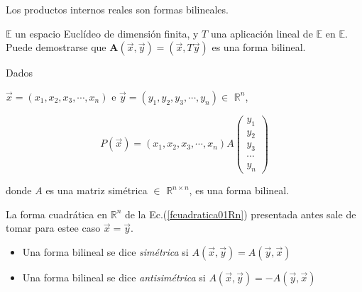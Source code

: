 \bigskip

\bigskip

\begin{remark}
Los productos internos reales son formas bilineales.
\end{remark}

\bigskip

\bigskip


\begin{example}
$\mathbb{E}$ un espacio  Euclídeo de dimensión finita, y $T$ una aplicación lineal de $\mathbb{E}$ en $\mathbb{E}$. Puede demostrarse que  $\mathbf{A}(\vec{x},\vec{y})=(\vec{x}, T \vec{y})$ es una forma bilineal.
\end{example}

\bigskip

\begin{example} 
Dados 

$\vec{x}=(x_1, x_2, x_3, \cdots, x_n)$ e $\vec{y}=(y_1, y_2, y_3, \cdots, y_n) \in$ $\mathbb{R}^{n}$,

$$P(\vec{x})=(x_1, x_2, x_3, \cdots, x_n)A \left(\begin{array}{c}  y_{1} \\  y_{2}  
\\  y_3 \\ \cdots \\  y_{n} 
\end{array}\right)$$

\noindent
donde  $A$ es una matriz  simétrica $\in$ $\mathbb{R}^{n \times n}$, es una forma bilineal.


\bigskip

La forma cuadrática en $\mathbb{R}^{n}$ de la Ec.(\ref{fcuadratica01Rn}) presentada antes sale de tomar para estee caso $\vec{x}=\vec{y}$.
\end{example}

\bigskip



\bigskip

\begin{remark}
\begin{itemize}
    \item 

Una forma bilineal se dice \textit{simétrica} si  $A(\vec{x},\vec{y})= A(\vec{y},\vec{x})$

\item 

Una forma bilineal se dice \textit{ antisimétrica} si  $A(\vec{x},\vec{y})= -A(\vec{y},\vec{x})$
\end{itemize}
\end{remark}


